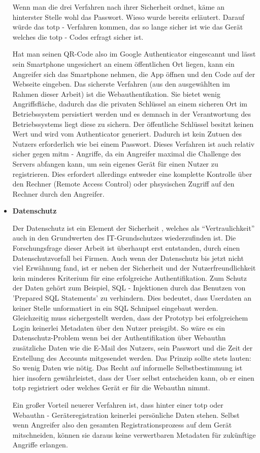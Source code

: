 \begin{itemize}
Wenn man die drei Verfahren nach ihrer Sicherheit ordnet, käme an hinterster Stelle wohl das Passwort. Wieso wurde bereits erläutert. Darauf würde das \ac{totp} - Verfahren kommen, das so lange sicher ist wie das Gerät welches die \ac{totp} - Codes erfragt sicher ist.

Hat man seinen QR-Code also im Google Authenticator eingescannt und lässt sein Smartphone ungesichert an einem öffentlichen Ort liegen, kann ein Angreifer sich das Smartphone nehmen, die App öffnen und den Code auf der Webseite eingeben. Das sicherste Verfahren (aus den ausgewählten im Rahmen dieser Arbeit) ist die Webauthentikation. Sie bietet wenig Angriffsfläche, dadurch das die privaten Schlüssel an einem sicheren Ort im Betriebssystem persistiert werden und es demnach in der Verantwortung des Betriebssystems liegt diese zu sichern. Der öffentliche Schlüssel besitzt keinen Wert und wird vom Authenticator generiert. Dadurch ist kein Zutuen des Nutzers erforderlich wie bei einem Passwort. Dieses Verfahren ist auch relativ sicher gegen \ac{mitm} - Angriffe, da ein Angreifer maximal die Challenge des Servers abfangen kann, um sein eigenes Gerät für einen Nutzer zu registrieren. Dies erfordert allerdings entweder eine komplette Kontrolle über den Rechner (Remote Access Control) oder phsysischen Zugriff auf den Rechner durch den Angreifer.

\item \textbf{Datenschutz}

Der Datenschutz ist ein Element der Sicherheit \cite{A28}, welches als ``Vertraulichkeit'' auch in den Grundwerten des IT-Grundschutzes wiederzufinden ist. Die Forschungsfrage dieser Arbeit ist überhaupt erst entstanden, durch einen Datenschutzvorfall bei Firmen. Auch wenn der Datenschutz bis jetzt nicht viel Erwähnung fand, ist er neben der Sicherheit und der Nutzerfreundlichkeit kein minderes Kriterium für eine erfolgreiche Authentifikation. Zum Schutz der Daten gehört zum Beispiel, SQL - Injektionen durch das Benutzen von 'Prepared SQL Statements' \cite{A28} zu verhindern. Dies bedeutet, dass Userdaten an keiner Stelle unformatiert in ein SQL Schnipsel eingebaut werden. Gleichzeitig muss sichergestellt werden, dass der Prototyp bei erfolgreichem Login keinerlei Metadaten über den Nutzer preisgibt. So wäre es ein Datenschutz-Problem wenn bei der Authentifikation über Webauthn zusätzliche Daten wie die E-Mail des Nutzers, sein Passwort und die Zeit der Erstellung des Accounts mitgesendet werden. Das Prinzip sollte stets lauten: So wenig Daten wie nötig. Das Recht auf informelle Selbstbestimmung \cite{A29} ist hier insofern gewährleistet, dass der User selbst entscheiden kann, ob er einen \ac{totp} registriert oder welches Gerät er für die Webauthn nimmt.
\newpage

Ein großer Vorteil neuerer Verfahren ist, dass hinter einer \ac{totp} oder Webauthn - Geräteregistration keinerlei persönliche Daten stehen. Selbst wenn Angreifer also den gesamten Registrationsprozess auf dem Gerät mitschneiden, können sie daraus keine verwertbaren Metadaten für zukünftige Angriffe erlangen.
\end{itemize}

